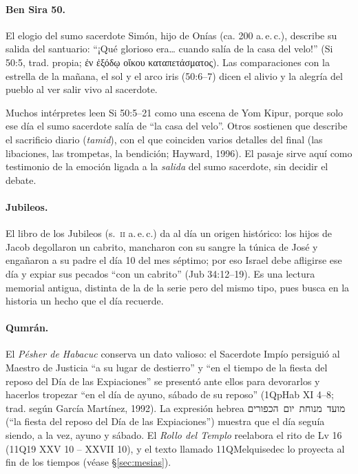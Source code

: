 \documentclass[11pt,letterpaper]{article}
\newcommand{\heb}[1]{\mbox{\foreignlanguage{hebrew}{#1}}}
\newcommand{\grc}[1]{\foreignlanguage{ancientgreek}{#1}}
\begin{document}
\paragraph{Ben Sira 50.} El elogio del sumo sacerdote Simón, hijo de Onías (ca. 200 a.\,e.\,c.), describe su salida del santuario: ``¡Qué glorioso era\ldots{} cuando salía de la casa del velo!'' (Si 50:5, trad. propia; \grc{ἐν ἐξόδῳ οἴκου καταπετάσματος}). Las comparaciones con la estrella de la mañana, el sol y el arco iris (50:6--7) dicen el alivio y la alegría del pueblo al ver salir vivo al sacerdote.

\begin{nota}[Precisión]
Muchos intérpretes leen Si 50:5--21 como una escena de Yom Kipur, porque solo ese día el sumo sacerdote salía de ``la casa del velo''. Otros sostienen que describe el sacrificio diario (\emph{tamid}), con el que coinciden varios detalles del final (las libaciones, las trompetas, la bendición; Hayward, 1996). El pasaje sirve aquí como testimonio de la emoción ligada a la \emph{salida} del sumo sacerdote, sin decidir el debate.
\end{nota}

\paragraph{Jubileos.} El libro de los Jubileos (s.~\textsc{ii} a.\,e.\,c.) da al día un origen histórico: los hijos de Jacob degollaron un cabrito, mancharon con su sangre la túnica de José y engañaron a su padre el día 10 del mes séptimo; por eso Israel debe afligirse ese día y expiar sus pecados ``con un cabrito'' (Jub 34:12--19). Es una lectura memorial antigua, distinta de la de la serie pero del mismo tipo, pues busca en la historia un hecho que el día recuerde.

\paragraph{Qumrán.} El \emph{Pésher de Habacuc} conserva un dato valioso: el Sacerdote Impío persiguió al Maestro de Justicia ``a su lugar de destierro'' y ``en el tiempo de la fiesta del reposo del Día de las Expiaciones'' se presentó ante ellos para devorarlos y hacerlos tropezar ``en el día de ayuno, sábado de su reposo'' (1QpHab XI 4--8; trad. según García Martínez, 1992). La expresión hebrea \heb{מועד מנוחת יום הכפורים} (``la fiesta del reposo del Día de las Expiaciones'') muestra que el día seguía siendo, a la vez, ayuno y sábado. El \emph{Rollo del Templo} reelabora el rito de Lv 16 (11Q19 XXV 10 -- XXVII 10), y el texto llamado 11QMelquisedec lo proyecta al fin de los tiempos (véase §\ref{sec:mesias}).
\end{document}

